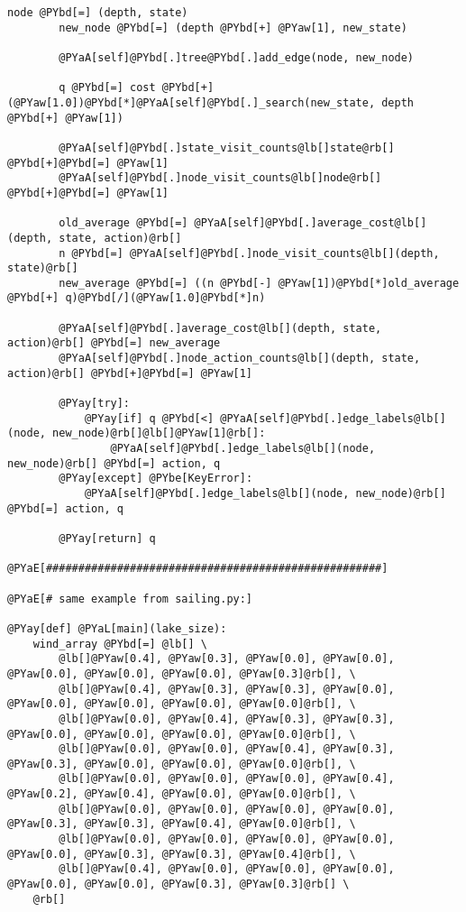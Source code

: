 \begin{Verbatim}[commandchars=@\[\]]
        node @PYbd[=] (depth, state)
        new_node @PYbd[=] (depth @PYbd[+] @PYaw[1], new_state)

        @PYaA[self]@PYbd[.]tree@PYbd[.]add_edge(node, new_node)

        q @PYbd[=] cost @PYbd[+] (@PYaw[1.0])@PYbd[*]@PYaA[self]@PYbd[.]_search(new_state, depth @PYbd[+] @PYaw[1])

        @PYaA[self]@PYbd[.]state_visit_counts@lb[]state@rb[] @PYbd[+]@PYbd[=] @PYaw[1]
        @PYaA[self]@PYbd[.]node_visit_counts@lb[]node@rb[] @PYbd[+]@PYbd[=] @PYaw[1]

        old_average @PYbd[=] @PYaA[self]@PYbd[.]average_cost@lb[](depth, state, action)@rb[]
        n @PYbd[=] @PYaA[self]@PYbd[.]node_visit_counts@lb[](depth, state)@rb[]
        new_average @PYbd[=] ((n @PYbd[-] @PYaw[1])@PYbd[*]old_average @PYbd[+] q)@PYbd[/](@PYaw[1.0]@PYbd[*]n)

        @PYaA[self]@PYbd[.]average_cost@lb[](depth, state, action)@rb[] @PYbd[=] new_average
        @PYaA[self]@PYbd[.]node_action_counts@lb[](depth, state, action)@rb[] @PYbd[+]@PYbd[=] @PYaw[1]

        @PYay[try]:
            @PYay[if] q @PYbd[<] @PYaA[self]@PYbd[.]edge_labels@lb[](node, new_node)@rb[]@lb[]@PYaw[1]@rb[]:
                @PYaA[self]@PYbd[.]edge_labels@lb[](node, new_node)@rb[] @PYbd[=] action, q
        @PYay[except] @PYbe[KeyError]:
            @PYaA[self]@PYbd[.]edge_labels@lb[](node, new_node)@rb[] @PYbd[=] action, q

        @PYay[return] q

@PYaE[####################################################]

@PYaE[# same example from sailing.py:]

@PYay[def] @PYaL[main](lake_size):
    wind_array @PYbd[=] @lb[] \
        @lb[]@PYaw[0.4], @PYaw[0.3], @PYaw[0.0], @PYaw[0.0], @PYaw[0.0], @PYaw[0.0], @PYaw[0.0], @PYaw[0.3]@rb[], \
        @lb[]@PYaw[0.4], @PYaw[0.3], @PYaw[0.3], @PYaw[0.0], @PYaw[0.0], @PYaw[0.0], @PYaw[0.0], @PYaw[0.0]@rb[], \
        @lb[]@PYaw[0.0], @PYaw[0.4], @PYaw[0.3], @PYaw[0.3], @PYaw[0.0], @PYaw[0.0], @PYaw[0.0], @PYaw[0.0]@rb[], \
        @lb[]@PYaw[0.0], @PYaw[0.0], @PYaw[0.4], @PYaw[0.3], @PYaw[0.3], @PYaw[0.0], @PYaw[0.0], @PYaw[0.0]@rb[], \
        @lb[]@PYaw[0.0], @PYaw[0.0], @PYaw[0.0], @PYaw[0.4], @PYaw[0.2], @PYaw[0.4], @PYaw[0.0], @PYaw[0.0]@rb[], \
        @lb[]@PYaw[0.0], @PYaw[0.0], @PYaw[0.0], @PYaw[0.0], @PYaw[0.3], @PYaw[0.3], @PYaw[0.4], @PYaw[0.0]@rb[], \
        @lb[]@PYaw[0.0], @PYaw[0.0], @PYaw[0.0], @PYaw[0.0], @PYaw[0.0], @PYaw[0.3], @PYaw[0.3], @PYaw[0.4]@rb[], \
        @lb[]@PYaw[0.4], @PYaw[0.0], @PYaw[0.0], @PYaw[0.0], @PYaw[0.0], @PYaw[0.0], @PYaw[0.3], @PYaw[0.3]@rb[] \
    @rb[]


\end{Verbatim}
